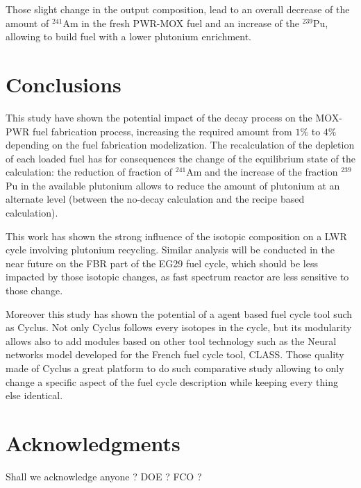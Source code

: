 \documentclass{anstrans}
\begin{document}
Those slight change in the output composition, lead to an overall decrease of
the amount of $^{241}$Am in the fresh PWR-MOX fuel and an increase of the
$^{239}$Pu, allowing to build fuel with a lower plutonium enrichment.


\section{Conclusions}

This study have shown the potential impact of the decay process on the MOX-PWR fuel
fabrication process, increasing the required amount from $1\%$ to $4\%$
depending on the fuel fabrication modelization. The recalculation of the 
depletion of each loaded fuel has for consequences the change of the equilibrium
state of the calculation: the reduction of fraction of $^{241}$Am and the increase of the
fraction $^{239}$Pu in the available plutonium allows to reduce the amount of
plutonium at an alternate level (between the no-decay calculation and the recipe
based calculation). 

This work has shown the strong influence of the isotopic composition on a LWR
cycle involving plutonium recycling. Similar analysis will be conducted in the
near future on the FBR part of the EG29 fuel cycle, which should be less
impacted by those isotopic changes, as fast spectrum reactor are less sensitive
to those change.

Moreover this study has shown the potential of a agent based fuel cycle tool
such as Cyclus. Not only Cyclus follows every isotopes in the cycle,
but its modularity allows also to add modules based on other tool technology such
as the Neural networks model developed for the French fuel cycle tool, CLASS.
Those quality made of Cyclus a great platform to do such comparative study
allowing to only change a specific aspect of the fuel cycle description while
keeping every thing else identical.






%

\section{Acknowledgments}
Shall we acknowledge anyone ? DOE ? FCO ?




\end{document}
